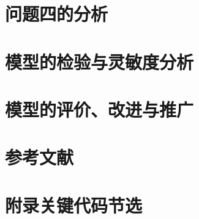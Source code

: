 \documentclass[12pt,a4paper,fontset=none]{ctexart}
\begin{document}
\section{问题四的分析}


\section{模型的检验与灵敏度分析}


\section{模型的评价、改进与推广}


\section{参考文献}


\newpage
\section*{附录\quad 关键代码节选}

\end{document}
